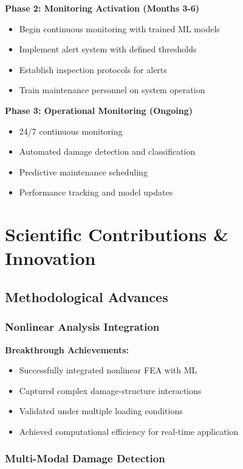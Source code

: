 \documentclass[12pt,a4paper]{article}
\begin{document}
\textbf{Phase 2: Monitoring Activation (Months 3-6)}
\begin{itemize}
    \item Begin continuous monitoring with trained ML models
    \item Implement alert system with defined thresholds
    \item Establish inspection protocols for alerts
    \item Train maintenance personnel on system operation
\end{itemize}

\textbf{Phase 3: Operational Monitoring (Ongoing)}
\begin{itemize}
    \item 24/7 continuous monitoring
    \item Automated damage detection and classification
    \item Predictive maintenance scheduling
    \item Performance tracking and model updates
\end{itemize}

\section{Scientific Contributions \& Innovation}

\subsection{Methodological Advances}

\subsubsection{Nonlinear Analysis Integration}

\textbf{Breakthrough Achievements:}
\begin{itemize}
    \item Successfully integrated nonlinear FEA with ML
    \item Captured complex damage-structure interactions
    \item Validated under multiple loading conditions
    \item Achieved computational efficiency for real-time application
\end{itemize}

\subsubsection{Multi-Modal Damage Detection}
\end{document}
